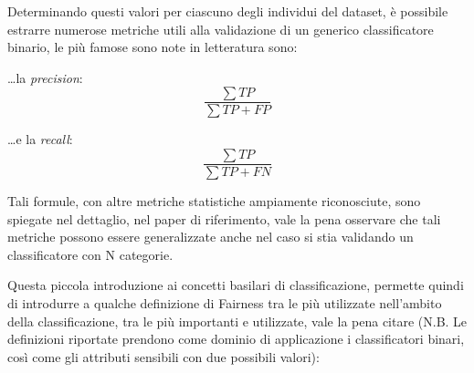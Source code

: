  Determinando questi valori per ciascuno degli individui del dataset, è possibile estrarre numerose metriche utili alla validazione di un generico classificatore binario, le più famose sono note in letteratura sono:
 
 \ldots la \emph{precision}:
\begin{equation*}
\frac{\sum{TP}}{\sum{TP + FP}}
\end{equation*}


 \ldots  e la \emph{recall}:
\begin{equation*}
\frac{\sum{TP}}{\sum{TP + FN}}
\end{equation*}

Tali formule, con altre metriche statistiche ampiamente riconosciute, sono spiegate nel dettaglio, nel paper  di riferimento\cite{FairnessDefinitionExplained}, vale la pena osservare che tali metriche possono essere generalizzate anche nel caso si stia validando un classificatore con N categorie.

Questa piccola introduzione ai concetti basilari di classificazione, permette quindi di introdurre a qualche definizione di Fairness tra le più utilizzate nell'ambito della classificazione, tra le più importanti e utilizzate, vale la pena citare (N.B. Le definizioni riportate prendono come dominio di applicazione i classificatori binari, così come gli attributi sensibili con due possibili valori)\cite{FairnessDefinitionExplained}:

